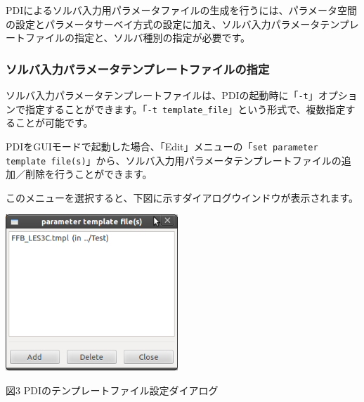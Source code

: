 \documentclass[a4paper,11pt]{jarticle}
\begin{document}
PDIによるソルバ入力用パラメータファイルの生成を行うには、パラメータ空間の設定とパラメータサーベイ方式の設定に加え、ソルバ入力パラメータテンプレートファイルの指定と、ソルバ種別の指定が必要です。

\subsubsection{ソルバ入力パラメータテンプレートファイルの指定}

ソルバ入力パラメータテンプレートファイルは、PDIの起動時に「{\tt -t}」オプションで指定することができます。「{\tt -t template\_file}」という形式で、複数指定することが可能です。

PDIをGUIモードで起動した場合、「Edit」メニューの「{\tt set parameter template file(s)}」から、ソルバ入力用パラメータテンプレートファイルの追加／削除を行うことができます。

このメニューを選択すると、下図に示すダイアログウインドウが表示されます。

\begin{center}
\includegraphics[width=184pt, bb=0 0 327 296]{figs/fig003.png}

図3 PDIのテンプレートファイル設定ダイアログ
\end{center}
\end{document}
